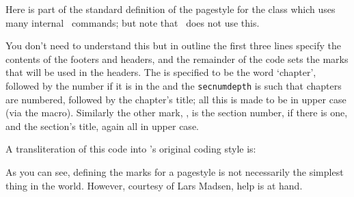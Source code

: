     Here is part of the standard definition of the 
pagestyle for the  class which uses many internal \ltx\ commands;
but note that \Mname\ does not use this.
\begin{lcode}
\def\ps@headings{%
  \let\@oddfoot\@empty\let\@evenfoot\@empty
  \def\@evenhead{\thepage\hfil\slshape\leftmark}%
  \def\@oddhead{{\slshape\rightmark}\hfil\thepage}%
  \def\chaptermark##1{%
    \markboth{\MakeUppercase{%
      \ifnum\c@secnumdepth > \m@ne
        \if@mainmatter
          \@chapapp\ \thechapter. \ %
        \fi
      \fi
      ##1}}{}}%
  \def\sectionmark##1{%
    \markright{\MakeUppercase{%
      \ifnum\c@secnumdepth > \z@
        \thesection. \ %
      \fi
      ##1}}}}
\end{lcode}
You don't need to understand this but in outline the first three lines specify
the contents of the footers and headers, and the remainder of the code sets 
the marks that will be used in the headers. The \cmd{\leftmark} is specified to be
the word `chapter', 
followed by the number if it is in the \cmd{\mainmatter} and the \texttt{secnumdepth}
is such that chapters are numbered, followed by the chapter's title; all this 
is made to be in upper case (via the \cmd{\MakeUppercase} macro). Similarly
the other mark, \cmd{\rightmark}, is the section number, if there is one, and
the section's title, again all in upper case.

    A transliteration of this code into \Mname's original coding style is:
\begin{lcode}
\end{lcode}
As you can see, defining the marks for a pagestyle is not necessarily the
simplest thing in the world. However, courtesy of Lars Madsen,
help is at hand.


